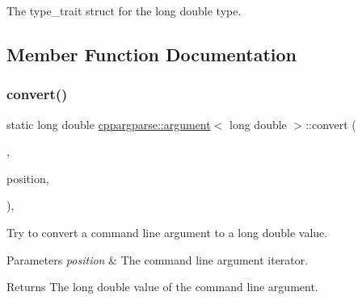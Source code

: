 The type\+\_\+trait struct for the long double type. 

\subsection{Member Function Documentation}
\mbox{\label{structcppargparse_1_1argument_3_01long_01double_01_4_a9987289594effd9b0561188827010cb2}} 
\subsubsection{\texorpdfstring{convert()}{convert()}}
{\footnotesize\ttfamily static long double \hyperlink{structcppargparse_1_1argument}{cppargparse\+::argument}$<$ long double $>$\+::convert (\begin{DoxyParamCaption}\item[{const types\+::\+Command\+Line\+\_\+t \&}]{,  }\item[{const types\+::\+Command\+Line\+Position\+\_\+t \&}]{position,  }\item[{const types\+::\+Command\+Line\+Arguments\+\_\+t \&}]{ }\end{DoxyParamCaption})\hspace{0.3cm}{\ttfamily [inline]}, {\ttfamily [static]}}



Try to convert a command line argument to a long double value. 


\begin{DoxyParams}{Parameters}
{\em position} & The command line argument iterator.\\
\hline
\end{DoxyParams}
\begin{DoxyReturn}{Returns}
The long double value of the command line argument. 
\end{DoxyReturn}
\mbox{\label{structcppargparse_1_1argument_3_01long_01double_01_4_a3030b59e675dcf51191cfc6e61bd6141}} 
